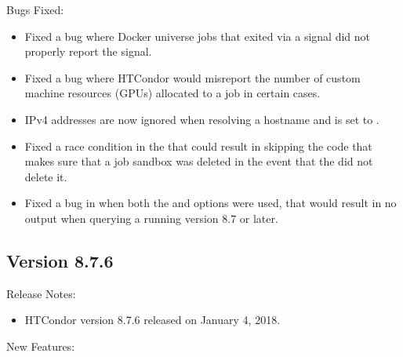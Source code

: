 \noindent Bugs Fixed:

\begin{itemize}

\item Fixed a bug where Docker universe jobs that exited via a signal
did not properly report the signal.

\item Fixed a bug where HTCondor would misreport the number of custom
machine resources (GPUs) allocated to a job in certain cases.

\item IPv4 addresses are now ignored when resolving a hostname and
 is set to .

\item Fixed a race condition in the  that could result in skipping the
code that makes sure that a job sandbox was deleted in the event that the  did
not delete it.

\item Fixed a bug in  when both the  and  options were used, that would
result in no output when querying a  running version 8.7 or later.


\end{itemize}

\subsection*{\label{sec:New-8-7-6}Version 8.7.6}

\noindent Release Notes:

\begin{itemize}

\item HTCondor version 8.7.6 released on January 4, 2018.

\end{itemize}


\noindent New Features:

